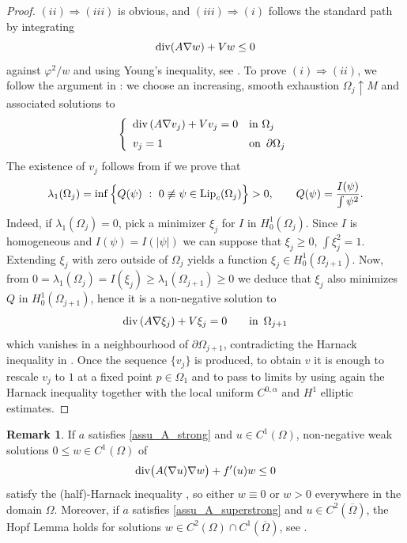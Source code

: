 \documentclass[10 pt,a4paper]{article}
\theoremstyle{definition}
\newtheorem{remark}[definition]{Remark}
\begin{document}
\begin{proof}
	$(ii) \Rightarrow (iii)$ is obvious, and $(iii) \Rightarrow (i)$ follows the standard path by integrating 
	\[
		\mathrm{div}(A \nabla w) + Vw \le 0
	\]
	against $\varphi^2/w$ and using Young's inequality, see \cite[Lemma 3.10]{prs}. To prove $(i) \Rightarrow (ii)$, we follow the argument in \cite[Theorem 1]{fischercolbrieschoen}: we choose an increasing, smooth exhaustion $\Omega_j \uparrow M$ and associated solutions to
	\[
		\left\{ \begin{array}{ll}
			\mathrm{div} \left( A\nabla v_j\right) + V v_j = 0	& \text{in } \Omega_j \\[0.2cm]
			v_j = 1 & \text{on } \, \partial \Omega_j
		\end{array} \right.
	\]
	The existence of $v_j$ follows from \cite[Theorems 8.6, 8.12, 8.29]{gilbargtrudinger} if we prove that 
	\[
		\lambda_1(\Omega_j) = \inf\Big\{ Q(\psi) \ : \ 0 \not \equiv \psi \in \mathrm{Lip}_c(\Omega_j) \Big\} > 0, \qquad Q(\psi) = \frac{I(\psi)}{\int \psi^2}.
	\]
	Indeed, if $\lambda_1(\Omega_j) = 0$, pick a minimizer $\xi_j$ for $I$ in $H^1_0(\Omega_j)$. Since $I$ is homogeneous and $I(\psi) = I(|\psi|)$ we can suppose that $\xi_j \ge 0$, $\int \xi_j^2  = 1$. Extending $\xi_j$ with zero outside of $\Omega_j$ yields a function $\xi_j \in H^1_0(\Omega_{j+1})$. Now, from $0 = \lambda_1(\Omega_j) = I(\xi_j) \ge \lambda_1(\Omega_{j+1}) \ge 0$ we deduce that $\xi_j$  also minimizes $Q$ in $H^1_0(\Omega_{j+1})$, hence it is a non-negative solution to 
	\[
		\mathrm{div} \left( A \nabla \xi_j\right) + V\xi_j = 0 \qquad \text{in } \, \Omega_{j+1}
	\]
	which vanishes in a neighbourhood of $\partial \Omega_{j+1}$, contradicting the Harnack inequality in \cite[Theorem 8.20 and Corollary 8.21]{gilbargtrudinger}. Once the sequence $\{v_j\}$ is produced, to obtain $v$ it is enough to rescale $v_j$ to $1$ at a fixed point $p \in \Omega_1$ and to pass to limits by using again the Harnack inequality together with the local uniform $C^{0,\alpha}$ and $H^1$ elliptic estimates.  
\end{proof}

\begin{remark}\label{rem_harnackHopf}
	If $a$ satisfies \eqref{assu_A_strong} and $u \in C^1(\Omega)$, non-negative weak solutions $0 \le w \in C^1(\Omega)$ of 
	\[
		\mathrm{div}\big(A(\nabla u) \nabla w \big) + f'(u)w \le 0
	\]
	satisfy the (half)-Harnack inequality \cite[Thm. 7.1.2]{pucci_serrin}, so either  $w\equiv 0$ or $w>0$ everywhere in the domain $\Omega$. Moreover, if $a$ satisfies \eqref{assu_A_superstrong} and $u \in C^2(\overline\Omega)$, the Hopf Lemma holds for solutions $w \in C^2(\Omega) \cap C^1(\overline\Omega)$, see \cite[Theorem 2.8.3]{pucci_serrin}.
\end{remark}
\end{document}
